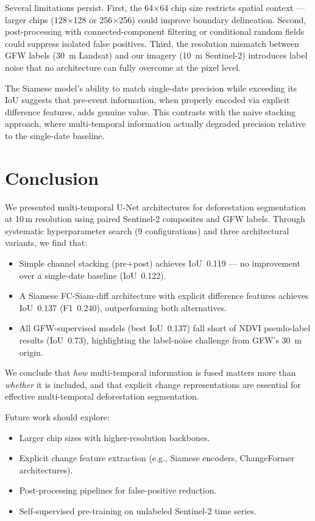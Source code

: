 \documentclass[twocolumn]{article}
\begin{document}
Several limitations persist.  First, the 64$\times$64 chip size 
restricts spatial context --- larger chips (128$\times$128 or 
256$\times$256) could improve boundary delineation.  Second, 
post-processing with connected-component filtering or conditional 
random fields could suppress isolated false positives.  
Third, the resolution mismatch between GFW labels (30~m Landsat) 
and our imagery (10~m Sentinel-2) introduces label noise that no 
architecture can fully overcome at the pixel level.

The Siamese model's ability to match single-date precision while 
exceeding its IoU suggests that pre-event information, when 
properly encoded via explicit difference features, adds genuine 
value.  This contrasts with the naive stacking approach, where 
multi-temporal information actually degraded precision relative 
to the single-date baseline.

\section{Conclusion}
We presented multi-temporal U-Net architectures for deforestation 
segmentation at 10\,m resolution using paired Sentinel-2 composites 
and GFW labels.  Through systematic hyperparameter search 
(9 configurations) and three architectural variants, we find that:
\begin{itemize}
    \item Simple channel stacking (pre+post) achieves
          IoU~0.119 --- no improvement over a single-date baseline
          (IoU~0.122).
    \item A Siamese FC-Siam-diff architecture with explicit 
          difference features achieves IoU~0.137 (F1~0.240), 
          outperforming both alternatives.
    \item All GFW-supervised models (best IoU~0.137) fall short 
          of NDVI pseudo-label results (IoU~0.73), highlighting 
          the label-noise challenge from GFW's 30~m origin.
\end{itemize}
We conclude that \emph{how} multi-temporal information is fused
matters more than \emph{whether} it is included, and that explicit
change representations are essential for effective multi-temporal
deforestation segmentation.

Future work should explore:
\begin{itemize}
    \item Larger chip sizes with higher-resolution backbones.
    \item Explicit change feature extraction (e.g., Siamese 
          encoders, ChangeFormer architectures).
    \item Post-processing pipelines for false-positive reduction.
    \item Self-supervised pre-training on unlabeled Sentinel-2 
          time series.
\end{itemize}
\end{document}
